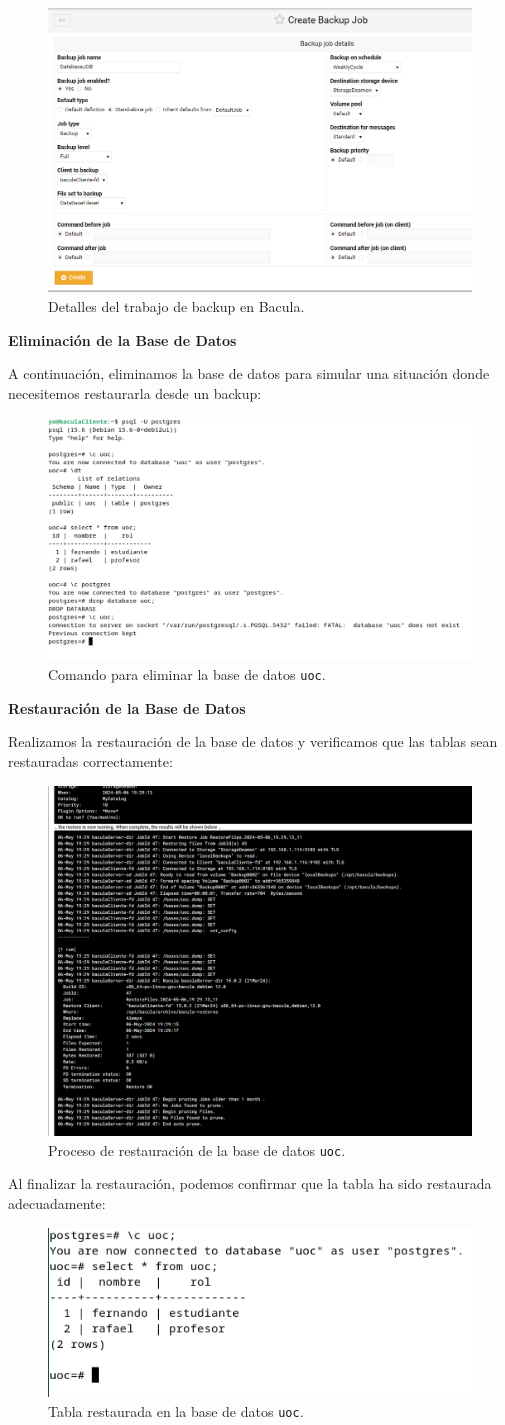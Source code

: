 \begin{figure}[H]
    \centering
    \includegraphics[width=0.5\linewidth]{instalacionBacula/databaseJOB.png}
    \caption{Detalles del trabajo de backup en Bacula.}
\end{figure}

\textbf{Eliminación de la Base de Datos}\medskip

A continuación, eliminamos la base de datos para simular una situación donde necesitemos restaurarla desde un backup:

\begin{figure}[H]
    \centering
    \includegraphics[width=0.5\linewidth]{instalacionBacula/dropdatabase.png}
    \caption{Comando para eliminar la base de datos \texttt{uoc}.}
\end{figure}

\textbf{Restauración de la Base de Datos}
\medskip

Realizamos la restauración de la base de datos y verificamos que las tablas sean restauradas correctamente:

\begin{figure}[H]
    \centering
    \includegraphics[width=0.5\linewidth]{instalacionBacula/restoreUOCdump.png}
    \caption{Proceso de restauración de la base de datos \texttt{uoc}.}
\end{figure}

Al finalizar la restauración, podemos confirmar que la tabla ha sido restaurada adecuadamente:

\begin{figure}[H]
    \centering
    \includegraphics[width=0.5\linewidth]{instalacionBacula/restoreCompleteTABLAS.png}
    \caption{Tabla restaurada en la base de datos \texttt{uoc}.}
\end{figure}
